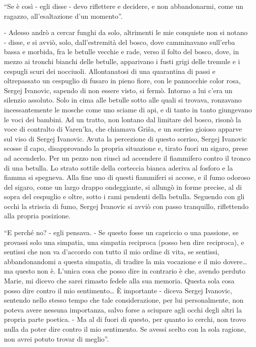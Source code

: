 ``Se è così - egli disse - devo riflettere e decidere, e non abbandonarmi, come un ragazzo, all'esaltazione d'un momento''. 

- Adesso andrò a cercar funghi da solo, altrimenti le mie conquiste non si notano - disse, e si avviò, solo, dall'estremità del bosco, dove camminavano sull'erba bassa e morbida, fra le betulle vecchie e rade, verso il folto del bosco, dove, in mezzo ai tronchi bianchi delle betulle, apparivano i fusti grigi delle tremule e i cespugli scuri dei nocciuoli. Allontanatosi di una quarantina di passi e oltrepassato un cespuglio di fusaro in pieno fiore, con le pannocchie color rosa, Sergej Ivanovic, sapendo di non essere visto, si fermò. Intorno a lui c'era un silenzio assoluto. Solo in cima alle betulle sotto alle quali si trovava, ronzavano incessantemente le mosche come uno sciame di api, e di tanto in tanto giungevano le voci dei bambini. Ad un tratto, non lontano dal limitare del bosco, risonò la voce di contralto di Varen'ka, che chiamava Griša, e un sorriso gioioso apparve sul viso di Sergej Ivanovic. Avuta la percezione di questo sorriso, Sergej Ivanovic scosse il capo, disapprovando la propria situazione e, tirato fuori un sigaro, prese ad accenderlo. Per un pezzo non riuscì ad accendere il fiammifero contro il tronco di una betulla. Lo strato sottile della corteccia bianca aderiva al fosforo e la fiamma si spegneva. Alla fine uno di questi fiammiferi si accese, e il fumo odoroso del sigaro, come un largo drappo ondeggiante, si allungò in forme precise, al di sopra del cespuglio e oltre, sotto i rami pendenti della betulla. Seguendo con gli occhi la striscia di fumo, Sergej Ivanovic si avviò con passo tranquillo, riflettendo alla propria posizione. 

``E perché no? - egli pensava. - Se questo fosse un capriccio o una passione, se provassi solo una simpatia, una simpatia reciproca (posso ben dire reciproca), e sentissi che non va d'accordo con tutto il mio ordine di vita, se sentissi, abbandonandomi a questa simpatia, di tradire la mia vocazione e il mio dovere\ldots{} ma questo non è. L'unica cosa che posso dire in contrario è che, avendo perduto Marie, mi dicevo che sarei rimasto fedele alla sua memoria. Questa sola cosa posso dire contro il mio sentimento\ldots{} È importante - diceva Sergej Ivanovic, sentendo nello stesso tempo che tale considerazione, per lui personalmente, non poteva avere nessuna importanza, salvo forse a sciupare agli occhi degli altri la propria parte poetica. - Ma al di fuori di questo, per quanto io cerchi, non trovo nulla da poter dire contro il mio sentimento. Se avessi scelto con la sola ragione, non avrei potuto trovar di meglio''. 

